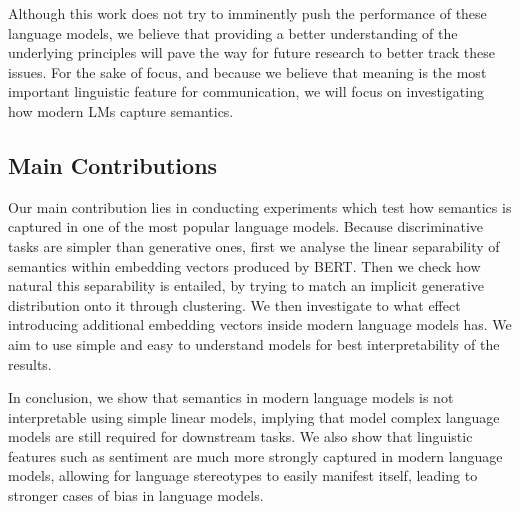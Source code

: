 \documentclass[a4paper,12pt,twoside,openright]{report}
\begin{document}
Although this work does not try to imminently push the performance of these language models, we believe that providing a better understanding of the underlying principles will pave the way for future research to better track these issues.
For the sake of focus, and because we believe that meaning is the most important linguistic feature for communication, we will focus on investigating how modern LMs capture semantics. \\

\subsection{Main Contributions}

Our main contribution lies in conducting experiments which test how semantics is captured in one of the most popular language models.
Because discriminative tasks are simpler than generative ones, first we analyse the linear separability of semantics within embedding vectors produced by BERT. 
Then we check how natural this separability is entailed, by trying to match an implicit generative distribution onto it through clustering.
We then investigate to what effect introducing additional embedding vectors inside modern language models has.
We aim to use simple and easy to understand models for best interpretability of the results.

In conclusion, we show that semantics in modern language models is not interpretable using simple linear models, implying that model complex language models are still required for downstream tasks.
We also show that linguistic features such as sentiment are much more strongly captured in modern language models, allowing for language stereotypes to easily manifest itself, leading to stronger cases of bias in language models.


%
\end{document}
